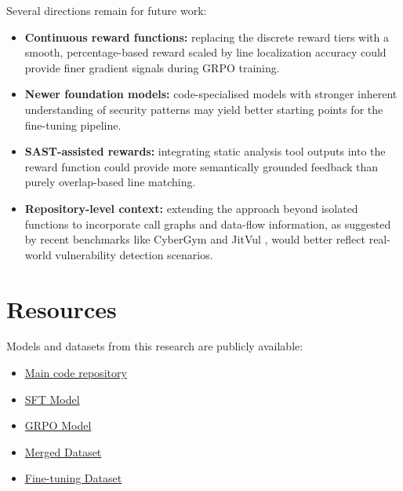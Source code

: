 \documentclass[12pt,a4paper]{article}
\begin{document}
Several directions remain for future work:
\begin{itemize}
\item \textbf{Continuous reward functions:} replacing the discrete reward tiers with a smooth, percentage-based reward scaled by line localization accuracy could provide finer gradient signals during GRPO training.
\item \textbf{Newer foundation models:} code-specialised models with stronger inherent understanding of security patterns may yield better starting points for the fine-tuning pipeline.
\item \textbf{SAST-assisted rewards:} integrating static analysis tool outputs into the reward function could provide more semantically grounded feedback than purely overlap-based line matching.
\item \textbf{Repository-level context:} extending the approach beyond isolated functions to incorporate call graphs and data-flow information, as suggested by recent benchmarks like CyberGym \cite{cybergym} and JitVul \cite{jitvul}, would better reflect real-world vulnerability detection scenarios.
\end{itemize}

\section*{Resources}
Models and datasets from this research are publicly available:
\begin{itemize}
\item \href{https://github.com/Andrefty/MS_Research}{Main code repository}
\item \href{https://huggingface.co/Andrefty/qwen3-4b-vuln-sft-research}{SFT Model}
\item \href{https://huggingface.co/Andrefty/qwen3-4b-vuln-grpo-verl}{GRPO Model}
\item \href{https://huggingface.co/datasets/Andrefty/Research_merged_dataset}{Merged Dataset}
\item \href{https://huggingface.co/datasets/Andrefty/Research_merged_finetune_dataset}{Fine-tuning Dataset} 
\end{itemize}

% 


\end{document}
